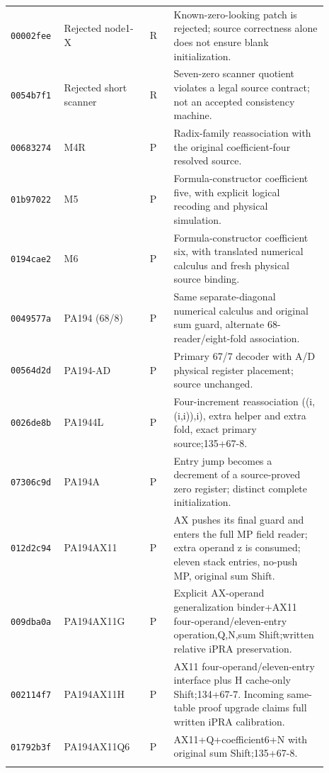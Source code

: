 \begin{longtable}{p{0.12\linewidth}p{0.25\linewidth}p{0.07\linewidth}p{0.45\linewidth}}
\texttt{00002fee} & Rejected node1-X & R & Known-zero-looking patch is rejected; source correctness alone does not ensure blank initialization. \\ \addlinespace[2pt]
\texttt{0054b7f1} & Rejected short scanner & R & Seven-zero scanner quotient violates a legal source contract; not an accepted consistency machine. \\ \addlinespace[2pt]
\texttt{00683274} & M4R & P & Radix-family reassociation with the original coefficient-four resolved source. \\ \addlinespace[2pt]
\texttt{01b97022} & M5 & P & Formula-constructor coefficient five, with explicit logical recoding and physical simulation. \\ \addlinespace[2pt]
\texttt{0194cae2} & M6 & P & Formula-constructor coefficient six, with translated numerical calculus and fresh physical source binding. \\ \addlinespace[2pt]
\texttt{0049577a} & PA194 (68/8) & P & Same separate-diagonal numerical calculus and original sum guard, alternate 68-reader/eight-fold association. \\ \addlinespace[2pt]
\texttt{00564d2d} & PA194-AD & P & Primary 67/7 decoder with A/D physical register placement; source unchanged. \\ \addlinespace[2pt]
\texttt{0026de8b} & PA1944L & P & Four-increment reassociation ((i,(i,i)),i), extra helper and extra fold, exact primary source;135+67-8. \\ \addlinespace[2pt]
\texttt{07306c9d} & PA194A & P & Entry jump becomes a decrement of a source-proved zero register; distinct complete initialization. \\ \addlinespace[2pt]
\texttt{012d2c94} & PA194AX11 & P & AX pushes its final guard and enters the full MP field reader; extra operand z is consumed; eleven stack entries, no-push MP, original sum Shift. \\ \addlinespace[2pt]
\texttt{009dba0a} & PA194AX11G & P & Explicit AX-operand generalization binder+AX11 four-operand/eleven-entry operation,Q,N,sum Shift;written relative iPRA preservation. \\ \addlinespace[2pt]
\texttt{002114f7} & PA194AX11H & P & AX11 four-operand/eleven-entry interface plus H cache-only Shift;134+67-7. Incoming same-table proof upgrade claims full written iPRA calibration. \\ \addlinespace[2pt]
\texttt{01792b3f} & PA194AX11Q6 & P & AX11+Q+coefficient6+N with original sum Shift;135+67-8. \\ \addlinespace[2pt]

\end{longtable}
